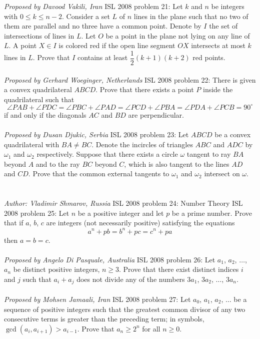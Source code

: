 \textit{Proposed by Davood Vakili, Iran} 
ISL 2008 problem 21:  Let $ k$ and $ n$ be integers with $ 0\le k\le n - 2$. Consider a set $ L$ of $ n$ lines in the plane such that no two of them are parallel and no three have a common point. Denote by $ I$ the set of intersections of lines in $ L$. Let $ O$ be a point in the plane not lying on any line of $ L$. A point $ X\in I$ is colored red if the open line segment $ OX$ intersects at most $ k$ lines in $ L$. Prove that $ I$ contains at least $ \dfrac{1}{2}(k + 1)(k + 2)$ red points. \\\\
\textit{Proposed by Gerhard Woeginger, Netherlands} 
ISL 2008 problem 22:  There is given a convex quadrilateral $ ABCD$. Prove that there exists a point $ P$ inside the quadrilateral such that
\[
\angle PAB + \angle PDC = \angle PBC + \angle PAD = \angle PCD + \angle PBA = \angle PDA + \angle PCB = 90^{\circ}
\]
if and only if the diagonals $ AC$ and $ BD$ are perpendicular. \\\\
\textit{Proposed by Dusan Djukic, Serbia} 
ISL 2008 problem 23:  Let $ ABCD$ be a convex quadrilateral with $ BA\neq BC$. Denote the incircles of triangles $ ABC$ and $ ADC$ by $ \omega_1$ and $ \omega_2$ respectively. Suppose that there exists a circle $ \omega$ tangent to ray $ BA$ beyond $ A$ and to the ray $ BC$ beyond $ C$, which is also tangent to the lines $ AD$ and $ CD$. Prove that the common external tangents to $ \omega_1$ and $\omega_2$ intersect on $ \omega$. \\\\\\
\textit{Author: Vladimir Shmarov, Russia} 
ISL 2008 problem 24:  Number Theory 
ISL 2008 problem 25:  Let $n$ be a positive integer and let $p$ be a prime number. Prove that if $a$, $b$, $c$ are integers (not necessarily positive) satisfying the equations
\[ a^n + pb = b^n + pc = c^n + pa \]
then $a = b = c$. \\\\
\textit{Proposed by Angelo Di Pasquale, Australia} 
ISL 2008 problem 26:  Let $ a_1$, $ a_2$, $ \ldots$, $ a_n$ be distinct positive integers, $ n\ge 3$. Prove that there exist distinct indices $ i$ and $ j$ such that $ a_i + a_j$ does not divide any of the numbers $ 3a_1$, $ 3a_2$, $ \ldots$, $ 3a_n$. \\\\
\textit{Proposed by Mohsen Jamaali, Iran} 
ISL 2008 problem 27:  Let $ a_0$, $ a_1$, $ a_2$, $ \ldots$ be a sequence of positive integers such that the greatest common divisor of any two consecutive terms is greater than the preceding term; in symbols, $ \gcd (a_i, a_{i + 1}) > a_{i - 1}$. Prove that $ a_n\ge 2^n$ for all $ n\ge 0$. \\\\
